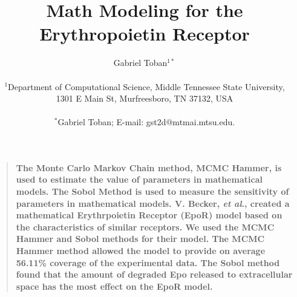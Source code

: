 \documentclass[12pt]{article}
\title{Math Modeling for the Erythropoietin Receptor}
\author
{Gabriel Toban$^{1\ast}$ \\
\\
\normalsize{$^{1}$Department of Computational Science, Middle Tennessee State University,}\\
\normalsize{1301 E Main St, Murfreesboro, TN 37132, USA}\\
\\
\normalsize{$^\ast$Gabriel Toban; E-mail:  gst2d@mtmai.mtsu.edu.}
}
\date{}
\newenvironment{sciabstract}{%
\begin{quote} \bf}
{\end{quote}}
\begin{document}
 


\baselineskip24pt


\maketitle 




\begin{sciabstract}
 The Monte Carlo Markov Chain method, MCMC Hammer, is used to estimate the value of parameters in mathematical models. The Sobol Method is used to measure the sensitivity of parameters in mathematical models. V. Becker, \textit{et al}., \cite{beck} created a mathematical Erythrpoietin Receptor (EpoR) model based on the characteristics of similar receptors. We used the MCMC Hammer and Sobol methods for their model. The MCMC Hammer method allowed the model to provide on average 56.11\% coverage of the experimental data. The Sobol method found that the amount of degraded Epo released to extracellular space has the most effect on the EpoR model.
\end{sciabstract}



\end{document}

